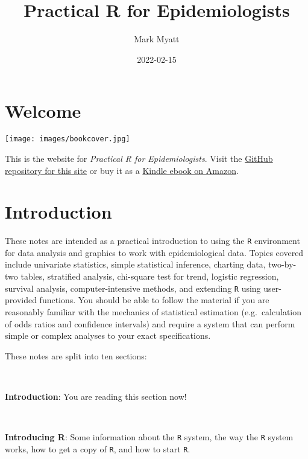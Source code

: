 \documentclass[
  12pt,
  a4paper]{book}
\title{Practical R for Epidemiologists}
\author{Mark Myatt}
\date{2022-02-15}
\begin{document}
\maketitle

{
\hypersetup{linkcolor=}
\setcounter{tocdepth}{1}
\tableofcontents
}
\hypertarget{welcome}{%
\chapter*{Welcome}\label{welcome}}

\texttt{[image: images/bookcover.jpg]}

This is the website for \emph{Practical R for Epidemiologists}. Visit the \href{https://github.com/ernestguevarra/practical-r-for-epidemiologists}{GitHub repository for this site} or buy it as a \href{https://www.amazon.co.uk/Practical-R-Epidemiologists-Mark-Myatt-ebook/dp/B00DQATKIE/ref=sr_1_1?ie=UTF8\&qid=1524423427\&sr=8-1\&keywords=practical+r+for+epidemiologists}{Kindle ebook on Amazon}.

\hypertarget{introduction}{%
\chapter*{Introduction}\label{introduction}}

These notes are intended as a practical introduction to using the \texttt{R} environment for data analysis and graphics to work with epidemiological data. Topics covered include univariate statistics, simple statistical inference, charting data, two-by-two tables, stratified analysis, chi-square test for trend, logistic regression, survival analysis, computer-intensive methods, and extending \texttt{R} using user-provided functions. You should be able to follow the material if you are reasonably familiar with the mechanics of statistical estimation (e.g.~calculation of odds ratios and confidence intervals) and require a system that can perform simple or complex analyses to your exact specifications.

These notes are split into ten sections:

~

\textbf{Introduction}: You are reading this section now!

~

\textbf{Introducing R}: Some information about the \texttt{R} system, the way the \texttt{R} system works, how to get a copy of \texttt{R}, and how to start \texttt{R}.
\end{document}
